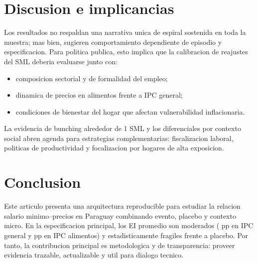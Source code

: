 \section{Discusion e implicancias}

Los resultados no respaldan una narrativa unica de espiral sostenida en toda la muestra; mas bien, sugieren comportamiento dependiente de episodio y especificacion. Para politica publica, esto implica que la calibracion de reajustes del SML deberia evaluarse junto con:
\begin{itemize}
  \item composicion sectorial y de formalidad del empleo;
  \item dinamica de precios en alimentos frente a IPC general;
  \item condiciones de bienestar del hogar que afectan vulnerabilidad inflacionaria.
\end{itemize}

La evidencia de bunching alrededor de 1 SML y los diferenciales por contexto social abren agenda para estrategias complementarias: fiscalizacion laboral, politicas de productividad y focalizacion por hogares de alta exposicion.

\section{Conclusion}

Este articulo presenta una arquitectura reproducible para estudiar la relacion salario minimo--precios en Paraguay combinando evento, placebo y contexto micro. En la especificacion principal, los EI promedio son moderados (\eiGeneralMain{} pp en IPC general y \eiAlimentosMain{} pp en IPC alimentos) y estadisticamente fragiles frente a placebo. Por tanto, la contribucion principal es metodologica y de transparencia: proveer evidencia trazable, actualizable y util para dialogo tecnico.
